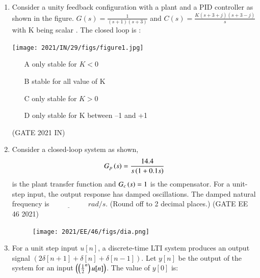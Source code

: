 \begin{enumerate}[label=\thechapter.\arabic*,ref=\thechapter.\theenumi]
\solution

\pagebreak
\item Consider a unity feedback configuration with a plant and a PID controller as shown in the figure. $G(s) = \frac{1}{(s+1)(s+3)} $ and $ C(s) = \frac{K(s+3+j)(s+3-j)}{s}$ with K being scalar . The closed loop is :
\begin{center}
\texttt{[image: 2021/IN/29/figs/figure1.jpg]}
\end{center}
\begin{enumerate}
\item[A]only stable for $K < 0$
\item[B]stable for all value of K
\item[C]only stable for $K > 0$
\item[D]only stable for K between –1 and +1
\end{enumerate}
\hfill(GATE 2021 IN)\\
\solution

\pagebreak
\item Consider a closed-loop system as shown, $$G_p\left(s\right)= \frac{14.4}{s\left(1+0.1s\right)}$$ is the plant transfer function and $G_c\left(s\right)=1$ is the compensator. For a unit-step input, the output response has damped oscillations. The damped natural frequency is $\underline{\hspace{2cm}}$
$rad/s$. (Round off to 2 decimal places.) 
\hfill(GATE EE 46 2021)

\begin{figure}[h]
    \centering  
\texttt{[image: 2021/EE/46/figs/dia.png]}
    \label{fig:ee.46.2021}
\end{figure}
\solution 

\pagebreak

\item For a unit step input $u[n]$, a discrete-time LTI system produces an output signal $(2\delta[n+1]+\delta[n]+\delta[n-1])$. Let $y[n]$ be the output of the system for an input $\left(\left(\frac{1}{2}^n\right)u[n]\right)$. The value of $y[0]$ is:
\begin{flushright}
\end{flushright}
\solution

\pagebreak


\end{enumerate}
